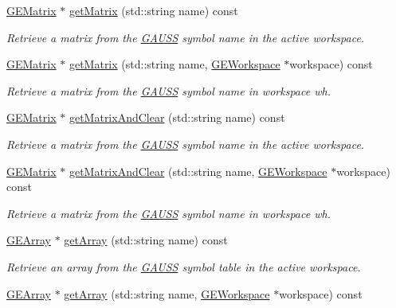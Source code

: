 \begin{DoxyCompactItemize}
\hyperlink{class_g_e_matrix}{G\-E\-Matrix} $\ast$ \hyperlink{class_g_a_u_s_s_a83597d96f2bd5de2faf00d4309583ad6}{get\-Matrix} (std\-::string name) const 
\begin{DoxyCompactList}\small\item\em Retrieve a matrix from the \hyperlink{class_g_a_u_s_s}{G\-A\-U\-S\-S} symbol name in the active workspace. \end{DoxyCompactList}\item 
\hyperlink{class_g_e_matrix}{G\-E\-Matrix} $\ast$ \hyperlink{class_g_a_u_s_s_a8aff4c5a84325dd4cd6837b63b814a77}{get\-Matrix} (std\-::string name, \hyperlink{class_g_e_workspace}{G\-E\-Workspace} $\ast$workspace) const 
\begin{DoxyCompactList}\small\item\em Retrieve a matrix from the \hyperlink{class_g_a_u_s_s}{G\-A\-U\-S\-S} symbol name in workspace {\itshape wh}. \end{DoxyCompactList}\item 
\hyperlink{class_g_e_matrix}{G\-E\-Matrix} $\ast$ \hyperlink{class_g_a_u_s_s_a5b9a2a49956027c991e5cdaad6bcce1d}{get\-Matrix\-And\-Clear} (std\-::string name) const 
\begin{DoxyCompactList}\small\item\em Retrieve a matrix from the \hyperlink{class_g_a_u_s_s}{G\-A\-U\-S\-S} symbol name in the active workspace. \end{DoxyCompactList}\item 
\hyperlink{class_g_e_matrix}{G\-E\-Matrix} $\ast$ \hyperlink{class_g_a_u_s_s_a190b2e2a6dedbd6f788a80d390475d4f}{get\-Matrix\-And\-Clear} (std\-::string name, \hyperlink{class_g_e_workspace}{G\-E\-Workspace} $\ast$workspace) const 
\begin{DoxyCompactList}\small\item\em Retrieve a matrix from the \hyperlink{class_g_a_u_s_s}{G\-A\-U\-S\-S} symbol name in workspace {\itshape wh}. \end{DoxyCompactList}\item 
\hyperlink{class_g_e_array}{G\-E\-Array} $\ast$ \hyperlink{class_g_a_u_s_s_ab4cb03076bfc07cb904bdaa7ca3dfc52}{get\-Array} (std\-::string name) const 
\begin{DoxyCompactList}\small\item\em Retrieve an array from the \hyperlink{class_g_a_u_s_s}{G\-A\-U\-S\-S} symbol table in the active workspace. \end{DoxyCompactList}\item 
\hyperlink{class_g_e_array}{G\-E\-Array} $\ast$ \hyperlink{class_g_a_u_s_s_af50bf0da3fd0ea3d0f1739db5650a6f0}{get\-Array} (std\-::string name, \hyperlink{class_g_e_workspace}{G\-E\-Workspace} $\ast$workspace) const 

\end{DoxyCompactItemize}
